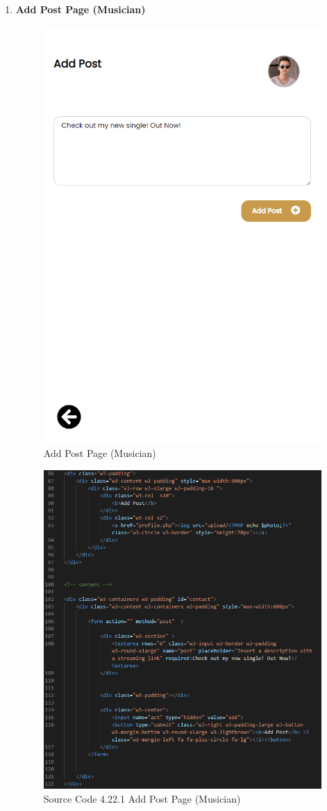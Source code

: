 \begin{enumerate}[1.]
    \item \textbf{Add Post Page (Musician)}
    \begin{figure}[h]
        \centering
        \includegraphics[width=0.5\linewidth]{mainmatter/images/frontend/ss/Add Post (Musician).png}
        \caption{Add Post Page (Musician)}
        \label{fig:myfig61}
    \end{figure}
    \begin{figure}[h]
        \centering
        \includegraphics[width=0.7\linewidth]{mainmatter/images/frontend/code/maddpost.png}
        \caption*{Source Code 4.22.1 Add Post Page (Musician)}
        \label{fig:myfig61a}
    \end{figure}


\end{enumerate}
